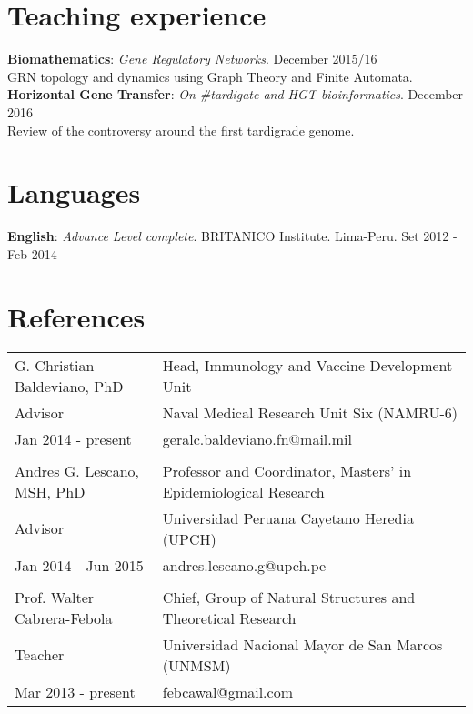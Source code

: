 \documentclass[margin,line]{res}
\begin{document}
\begin{resume}
\section{\sc Teaching experience}
{\bf Biomathematics}: {\em Gene Regulatory Networks}. \hfill {December 2015/16}\\ GRN topology and dynamics using Graph Theory and Finite Automata. \\ %
{\bf Horizontal Gene Transfer}: {\em On \#tardigate and HGT bioinformatics}. \hfill {December 2016}\\ 
Review of the controversy around the first tardigrade genome. \\


\section{\sc Languages}
{\bf English}: {\em Advance Level complete}. BRITANICO Institute. Lima-Peru. \hfill {Set 2012 - Feb 2014} \\

\section{\sc References }

\begin{tabular}{ l l }
	G. Christian Baldeviano, PhD & Head, Immunology and Vaccine Development Unit \\
	Advisor & Naval Medical Research Unit Six (NAMRU-6)\\
	Jan 2014 - present & geralc.baldeviano.fn@mail.mil\\
	&\\
	Andres G. Lescano, MSH, PhD & Professor and Coordinator, Masters' in Epidemiological Research\\
	Advisor & Universidad Peruana Cayetano Heredia (UPCH)\\
	Jan 2014 - Jun 2015 & andres.lescano.g@upch.pe\\
	&\\
	Prof. Walter Cabrera-Febola & Chief, Group of Natural Structures and Theoretical Research \\
	Teacher & Universidad Nacional Mayor de San Marcos (UNMSM)\\
	Mar 2013 - present & febcawal@gmail.com\\	
\end{tabular}


\end{resume}
\end{document}
